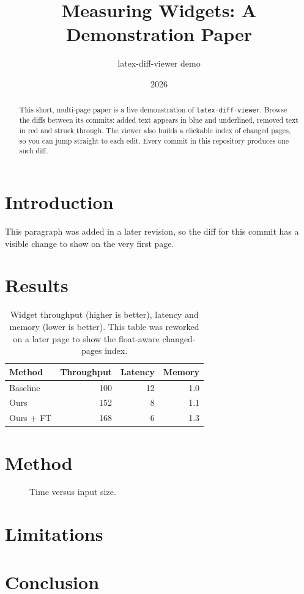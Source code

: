 \documentclass[11pt]{article}
\title{Measuring Widgets: A Demonstration Paper}
\author{latex-diff-viewer demo}
\date{2026}
\begin{document}
\maketitle

\begin{abstract}
This short, multi-page paper is a live demonstration of \texttt{latex-diff-viewer}.
Browse the diffs between its commits: added text appears in blue and underlined,
removed text in red and struck through. The viewer also builds a clickable index of
changed pages, so you can jump straight to each edit. Every commit in this repository
produces one such diff.
\end{abstract}

\section{Introduction}
\lipsum[1-2]

This paragraph was added in a later revision, so the diff for this commit has a
visible change to show on the very first page.

\section{Results}
\lipsum[3]

\begin{table}[t]
  \centering
  \begin{tabular}{lrrr}
    \toprule
    Method    & Throughput & Latency & Memory \\
    \midrule
    Baseline  & 100        & 12      & 1.0    \\
    Ours      & 152        & 8       & 1.1    \\
    Ours + FT & 168        & 6       & 1.3    \\
    \bottomrule
  \end{tabular}
  \caption{Widget throughput (higher is better), latency and memory
  (lower is better). This table was reworked on a later page to show the
  float-aware changed-pages index.}
  \label{tab:results}
\end{table}

\lipsum[4-5]

\section{Method}
\lipsum[6]

\begin{figure}[t]
  \centering
  \caption{Time versus input size.}
  \label{fig:scaling}
\end{figure}

\lipsum[7-8]

\section{Limitations}
\lipsum[10]

\section{Conclusion}
\lipsum[9]
\end{document}
